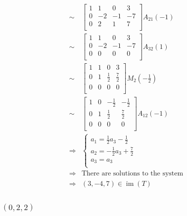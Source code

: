\documentclass{article}
\DeclareMathOperator{\im}{im}
\begin{document}
\begin{equation*}
\begin{split}
        \sim&\left[\begin{array}{ccc|c}
            1&1&0&3\\
            0&-2&-1&-7\\
            0&2&1&7\\
        \end{array}\right]A_{21}(-1)\\
        \sim&\left[\begin{array}{ccc|c}
            1&1&0&3\\
            0&-2&-1&-7\\
            0&0&0&0\\
        \end{array}\right]A_{32}(1)\\
        \sim&\left[\begin{array}{ccc|c}
            1&1&0&3\\
            0&1&\frac{1}{2}&\frac{7}{2}\\
            0&0&0&0\\
        \end{array}\right]M_2(-\frac{1}{2})\\
        \sim&\left[\begin{array}{ccc|c}
            1&0&-\frac{1}{2}&-\frac{1}{2}\\
            0&1&\frac{1}{2}&\frac{7}{2}\\
            0&0&0&0\\
            \end{array}\right]A_{12}(-1)\\
        \Rightarrow&\begin{cases}
            a_1=\frac{1}{2}a_3-\frac{1}{2}\\
            a_2=-\frac{1}{2}a_3+\frac{7}{2}\\
            a_3=a_3\\
        \end{cases}\\
        \Rightarrow&\text{There are solutions to the system}\\
        \Rightarrow&(3,-4,7)\in\im(T)\\
    \end{split}
\end{equation*}

\subsubsection{$(0,2,2)$}

~
\end{document}
